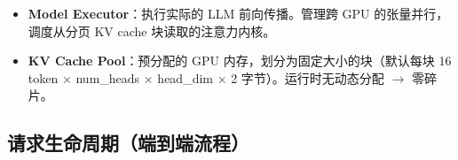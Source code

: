 \begin{itemize}
\begin{itemize}
  \item 分配（生成新 token $\rightarrow$ 需要新块）
  \item 写时复制（Copy-on-Write）（用于 beam search：多 beam 共享前缀块，仅在分叉时复制）
  \item Swap（抢占/恢复时在 GPU $\leftrightarrow$ CPU 之间迁移）
  \item 前缀缓存（Prefix Caching）（当 prompt 共享相同前缀时复用已缓存块）
\end{itemize}
  \item \textbf{Model Executor}：执行实际的 LLM 前向传播。管理跨 GPU 的张量并行，调度从分页 KV cache 块读取的注意力内核。
  \item \textbf{KV Cache Pool}：预分配的 GPU 内存，划分为固定大小的块（默认每块 16 token $\times$ num\_heads $\times$ head\_dim $\times$ 2 字节）。运行时无动态分配 $\rightarrow$ 零碎片。
\end{itemize}

\subsection{请求生命周期（端到端流程）}
\label{request-lifecycle-end-to-end-flow}

